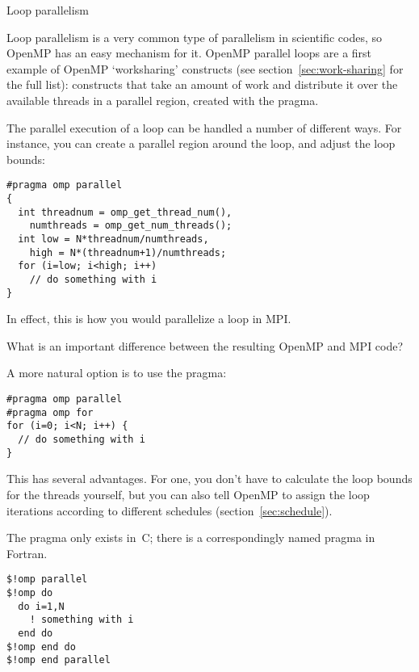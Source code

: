 
 {Loop parallelism}
\label{sec:omp-for}

Loop parallelism is a very common type of parallelism in scientific
codes, so OpenMP has an easy mechanism for it.
OpenMP parallel loops are a first example of OpenMP `worksharing'
constructs (see section~\ref{sec:work-sharing} for the full list):
constructs that take an amount of work and distribute it over the
available threads in a parallel region,
created with the  pragma.

The parallel execution of a loop can be handled a number of different ways.
For instance, you can create a parallel region around the loop, and
adjust the loop bounds:
\begin{lstlisting}
#pragma omp parallel
{
  int threadnum = omp_get_thread_num(),
    numthreads = omp_get_num_threads();
  int low = N*threadnum/numthreads,
    high = N*(threadnum+1)/numthreads;
  for (i=low; i<high; i++)
    // do something with i
}
\end{lstlisting}
In effect, this is how you would parallelize a loop in MPI.
\begin{exercise}
  What is an important difference between the resulting OpenMP and MPI code?
\end{exercise}

A more natural option is to use the
 pragma:
\begin{lstlisting}
#pragma omp parallel
#pragma omp for
for (i=0; i<N; i++) {
  // do something with i
}
\end{lstlisting}
This has several advantages. For one, you don't have to calculate the loop bounds
for the threads yourself, but you can also tell OpenMP to assign the loop
iterations according to different schedules (section~\ref{sec:schedule}).

\begin{fortrannote}
  The  pragma only exists in~C;
  there is a correspondingly named  pragma in Fortran.
\begin{lstlisting}
$!omp parallel
$!omp do
  do i=1,N
    ! something with i
  end do
$!omp end do
$!omp end parallel
\end{lstlisting}
\end{fortrannote}

